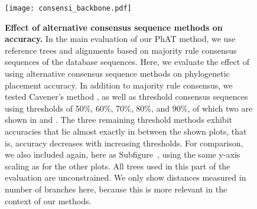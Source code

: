 \begin{figure}[hpbt]
    \centering
    \texttt{[image: consensi\_backbone.pdf]}
    \begin{subfigure}{0pt}
        \label{fig:consensi_backbone:sub:majorities}
    \end{subfigure}
    \begin{subfigure}{0pt}
        \label{fig:consensi_backbone:sub:cavener}
    \end{subfigure}
    \begin{subfigure}{0pt}
        \label{fig:consensi_backbone:sub:50_threshold}
    \end{subfigure}
    \begin{subfigure}{0pt}
        \label{fig:consensi_backbone:sub:90_threshold}
    \end{subfigure}
    \caption[Effect of alternative consensus sequence methods on accuracy]{
        \textbf{Effect of alternative consensus sequence methods on accuracy.}
        In the main evaluation of our \ac{PhAT} method,
        we use reference trees and alignments based on majority rule consensus sequences \citep{May1952,Day1992a}
        of the  database sequences.
        Here, we evaluate the effect of using alternative consensus sequence methods
        on phylogenetic placement accuracy.
        In addition to  majority rule consensus, we tested
         Cavener's method \citep{Cavener1987,Cavener1991a},
        as well as threshold consensus sequences \citep{Day1992a,Day1992}
        using thresholds of 50\%, 60\%, 70\%, 80\%, and 90\%, of which two are shown in
         and .
        The three remaining threshold methods exhibit accuracies that lie almost exactly in between the shown plots,
        that is, accuracy decreases with increasing thresholds.
        For comparison, we also included  again,
        here as Subfigure~,
        using the same y-axis scaling as for the other plots.
        All trees used in this part of the evaluation are unconstrained.
        We only show distances measured in number of branches here,
        because this is more relevant in the context of our methods.
    }
    \label{fig:consensi_backbone}
\end{figure}

